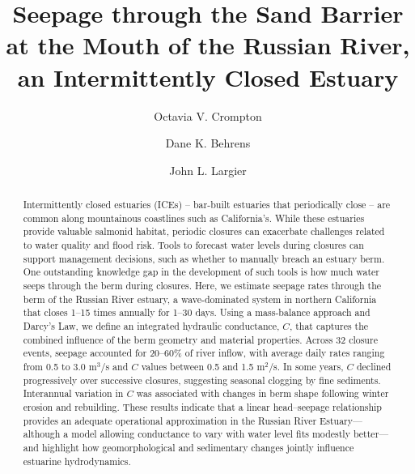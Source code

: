 \documentclass[preprint,12pt,authoryear]{elsarticle}
\begin{document}
\begin{frontmatter}

\title{Seepage through the Sand Barrier at the Mouth of the Russian River, an Intermittently Closed Estuary}

\author[ars]{Octavia V. Crompton}

\author[epa]{Dane K. Behrens}

\author[bml]{John L. Largier}

\begin{abstract}
 Intermittently closed estuaries (ICEs) -- bar-built estuaries that periodically close --  are common along mountainous coastlines such as California's. While these estuaries provide valuable salmonid habitat, periodic closures can exacerbate challenges related to water quality and flood risk. Tools to forecast water levels during closures can support management decisions, such as whether to manually breach an estuary berm. One outstanding knowledge gap in the development of such tools is how much water seeps through the berm during closures.
Here, we estimate seepage rates through the berm of the Russian River estuary, a wave-dominated system in northern California that closes 1--15 times annually for 1--30 days. Using a mass-balance approach and Darcy's Law, we define an integrated hydraulic conductance, $C$, that captures the combined influence of the berm geometry and material properties. Across 32 closure events, seepage accounted for 20--60\% of river inflow, with average daily rates ranging from 0.5 to 3.0 m$^3$/s and $C$ values between 0.5 and 1.5 m$^2$/s. In some years, $C$ declined progressively over successive closures, suggesting seasonal clogging by fine sediments. Interannual variation in $C$ was associated with changes in berm shape following winter erosion and rebuilding. These results indicate that a linear head--seepage relationship provides an adequate operational approximation in the Russian River Estuary---although a model allowing conductance to vary with water level fits modestly better---and highlight how geomorphological and sedimentary changes jointly influence estuarine hydrodynamics.
\end{abstract}


\end{frontmatter}
\end{document}
